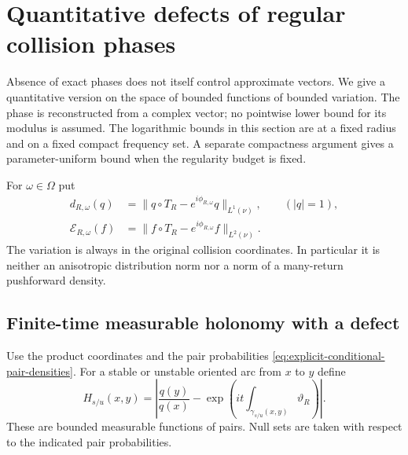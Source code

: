 \section{Quantitative defects of regular collision phases}
\label{sec:quantitative-phase-defects}
Absence of exact phases does not itself control approximate vectors.
We give a quantitative version on the space of bounded functions of
bounded variation. The phase is reconstructed from a complex vector;
no pointwise lower bound for its modulus is assumed. The logarithmic
bounds in this section are at a fixed radius and on a fixed compact
frequency set. A separate compactness argument gives a parameter-uniform
bound when the regularity budget is fixed.

For $\omega\in\Omega$ put
\begin{equation}\label{eq:collision-phase-defects}
 \begin{split}
 d_{R,\omega}(q)&=\|q\circ T_R-e^{i\phi_{R,\omega}}q\|_{L^1(\nu)},
                      \qquad (|q|=1),\\
 \mathcal E_{R,\omega}(f)&=\|f\circ T_R-e^{i\phi_{R,\omega}}f\|_{L^2(\nu)}.
 \end{split}
\end{equation}
The variation is always in the original collision coordinates. In
particular it is neither an anisotropic distribution norm nor a norm
of a many-return pushforward density.

\subsection{Finite-time measurable holonomy with a defect}
Use the product coordinates and the pair probabilities
\eqref{eq:explicit-conditional-pair-densities}. For a stable or unstable
oriented arc from $x$ to $y$ define
\[
 H_{s/u}(x,y)=
 \left|\frac{q(y)}{q(x)}-
            \exp\!\left(it\int_{\gamma_{s/u}(x,y)}\vartheta_R\right)\right|.
\]
These are bounded measurable functions of pairs. Null sets are taken
with respect to the indicated pair probabilities.

